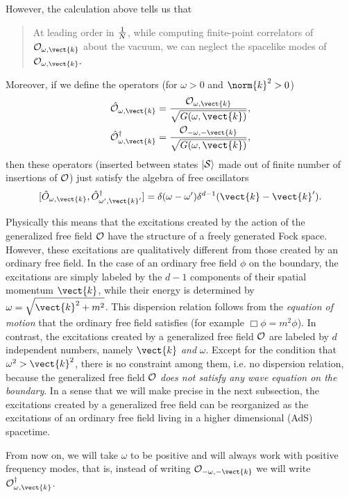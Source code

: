 However, the calculation above tells us that 
{\it
\begin{quote}
At leading order in ${1 \over N}$, while computing finite-point correlators of ${\cal O}_{\omega,\vect{k}}$ about the vacuum, we can neglect the spacelike modes of ${\cal O}_{\omega,\vect{k}}.$
\end{quote}}
\noindent Moreover, if we define the operators (for $\omega > 0$ and
$\norm{k}^2 > 0$)
\[
\begin{split}
\hat{\cal O}_{\omega, \vect{k}} &= {{\cal O}_{\omega, \vect{k}} \over 
\sqrt{G(\omega,\vect{k})}},
\\
\hat{\cal O}^{\dagger}_{\omega, \vect{k}} &= {{\cal O}_{-\omega, -\vect{k}} \over 
\sqrt{G(\omega,\vect{k})}},
\end{split}
 \]
then these operators (inserted between states $|{\cal S}\rangle$ made out of finite number of insertions of ${\cal O}$) just satisfy the algebra of free oscillators
\[
[\hat{O}_{\omega, \vect{k}}, \hat{O}_{\omega', \vect{k}'}^{\dagger}] = \delta(\omega-\omega') \delta^{d-1}(\vect{k} - \vect{k}').
 \]

Physically this means that the excitations created by the action of the generalized free field ${\cal O}$ have the structure of a freely generated Fock space. However, these excitations are qualitatively different from those created by an ordinary free field. In the case of an ordinary free field $\phi$ on the boundary, the excitations are simply labeled by the $d-1$ components of their spatial momentum $\vect{k}$, while their energy is determined by $\omega = \sqrt{\vect{k}^2+m^2}$. This dispersion relation follows from the {\it equation of motion} that the ordinary free field satisfies (for example $\Box\phi = m^2\phi$). In contrast, the excitations created by a generalized free field ${\cal O}$ are labeled by $d$ independent numbers, namely $\vect{k}$ {\it and} $\omega$. Except for the condition that $\omega^2 > \vect{k}^2$, there is no constraint among them, i.e. no dispersion relation, because the generalized free field ${\cal O}$ {\it does not satisfy any wave equation on the boundary}. 
In a sense that we will make precise in the next subsection, the excitations created by a generalized free field can be reorganized as the excitations of an ordinary free field living in a higher dimensional (AdS) spacetime.

From now on, we will take $\omega$ to be positive and will always work with positive frequency modes, that is, instead of writing ${\cal O}_{-\omega,-\vect{k}}$ we will write ${\cal O}_{\omega,\vect{k}}^\dagger$.

